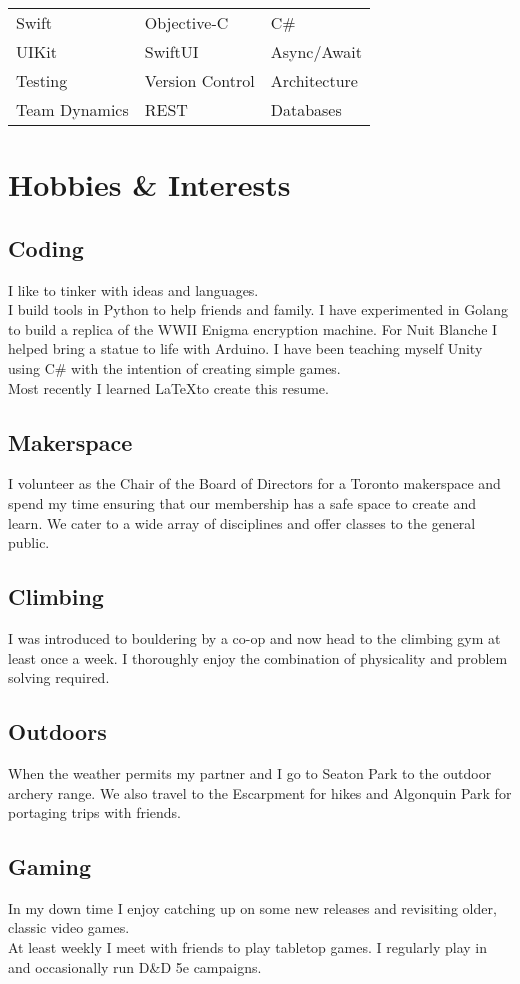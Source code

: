 \documentclass[
	10pt, %
]{FreemanCV}
\begin{document}
\begin{paracol}{2}
\begin{tabular}{@{}lll} 
Swift & Objective-C & C\# \\
UIKit & SwiftUI & Async/Await \\
Testing & Version Control & Architecture \\
Team Dynamics & REST & Databases
\end{tabular}
\medskip

\section{Hobbies \& Interests}
\subsection{Coding}
I like to tinker with ideas and languages.\\
I build tools in Python to help friends and family. I have experimented in Golang to build a replica of the WWII Enigma encryption machine. For Nuit Blanche I helped bring a statue to life with Arduino. I have been teaching myself Unity using C\# with the intention of creating simple games.\\
Most recently I learned \LaTeX to create this resume.
\subsection{Makerspace}
I volunteer as the Chair of the Board of Directors for a Toronto makerspace and spend my time ensuring that our membership has a safe space to create and learn. We cater to a wide array of disciplines and offer classes to the general public.
\subsection{Climbing}
I was introduced to bouldering by a co-op and now head to the climbing gym at least once a week. I thoroughly enjoy the combination of physicality and problem solving required.
\subsection{Outdoors}
When the weather permits my partner and I go to Seaton Park to the outdoor archery range. We also travel to the Escarpment for hikes and Algonquin Park for portaging trips with friends.
\subsection{Gaming}
In my down time I enjoy catching up on some new releases and revisiting older, classic video games.\\
At least weekly I meet with friends to play tabletop games.
I regularly play in and occasionally run D\&D 5e campaigns.


\end{paracol} %

\end{document}
